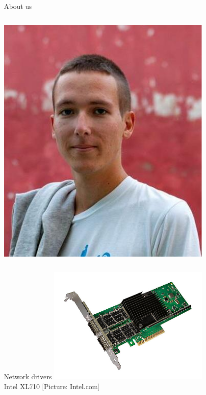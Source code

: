 \documentclass[NET,english,aspectratio=43,notitleframe]{tumbeamer}
\begin{document}
\begin{frame}{About us}
\begin{columns}
\begin{column}{0.15\textwidth}
\includegraphics[width=0.8\textwidth]{pics/simon.jpg}\\
\end{column}
\end{columns}
\end{frame}


\begin{frame}{Network drivers}
\centering\includegraphics[width=0.60\textwidth]{pics/nic3}\\
\vspace{-1em}\tiny{Intel XL710 [Picture: Intel.com]}
\end{frame}
\end{document}
